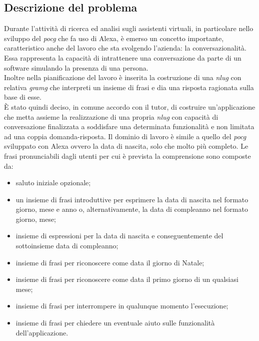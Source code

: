 	\subsection{Descrizione del problema}
	Durante l'attività di ricerca ed analisi sugli assistenti virtuali, in particolare nello sviluppo del \emph{\gls{pocg}} che fa uso di Alexa, è emerso un concetto importante, caratteristico anche del lavoro che sta svolgendo l'azienda: la conversazionalità. Essa rappresenta la capacità di intrattenere una conversazione da parte di un software simulando la presenza di una persona. \\
	Inoltre nella pianificazione del lavoro è inserita la costruzione di una \emph{\gls{nlug}} con relativa \emph{\gls{gramg}} che interpreti un insieme di frasi e dia una risposta ragionata sulla base di esse. \\
	È stato quindi deciso, in comune accordo con il tutor, di costruire un'applicazione che metta assieme la realizzazione di una propria \emph{\gls{nlug}} con capacità di conversazione finalizzata a soddisfare una determinata funzionalità e non limitata ad una coppia domanda-risposta. Il dominio di lavoro è simile a quello del \emph{\gls{pocg}} sviluppato con Alexa ovvero la data di nascita, solo che molto più completo. Le frasi pronunciabili dagli utenti per cui è prevista la comprensione sono  composte da:
	\begin{itemize}
		\item saluto iniziale opzionale;
		\item un insieme di frasi introduttive per esprimere la data di nascita nel formato giorno, mese e anno o, alternativamente, la data di compleanno nel formato giorno, mese;
		\item insieme di espressioni per la data di nascita e conseguentemente del sottoinsieme data di compleanno;
		\item insieme di frasi per riconoscere come data il giorno di Natale;
		\item insieme di frasi per riconoscere come data il primo giorno di un qualsiasi mese;
		\item insieme di frasi per interrompere in qualunque momento l'esecuzione;
		\item insieme di frasi per chiedere un eventuale aiuto sulle funzionalità dell'applicazione.
	\end{itemize}
